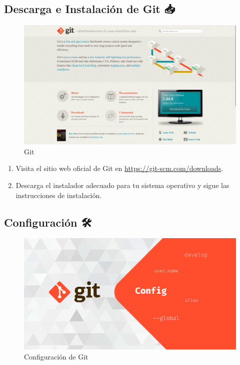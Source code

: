 \documentclass[
  a4paper,
  DIV=11,
  numbers=noendperiod,
  onepage,
  openany]{scrreprt}
\providecommand{\tightlist}{%
  \setlength{\itemsep}{0pt}\setlength{\parskip}{0pt}}\usepackage{longtable,booktabs,array}
\begin{document}
\subsection{Descarga e Instalación de Git
📥}\label{descarga-e-instalaciuxf3n-de-git}

\begin{figure}[H]

{\centering \includegraphics[width=6.25in,height=\textheight]{unidades/unidad0/../../images/website-git.png}

}

\caption{Git}

\end{figure}%

\begin{enumerate}
\def\labelenumi{\arabic{enumi}.}
\tightlist
\item
  Visita el sitio web oficial de Git en
  \url{https://git-scm.com/downloads}.
\item
  Descarga el instalador adecuado para tu sistema operativo y sigue las
  instrucciones de instalación.
\end{enumerate}

\subsection{Configuración 🛠️}\label{configuraciuxf3n}

\begin{figure}[H]

{\centering \includegraphics[width=6.25in,height=\textheight]{unidades/unidad0/../../images/git_config.png}

}

\caption{Configuración de Git}

\end{figure}%
\end{document}
